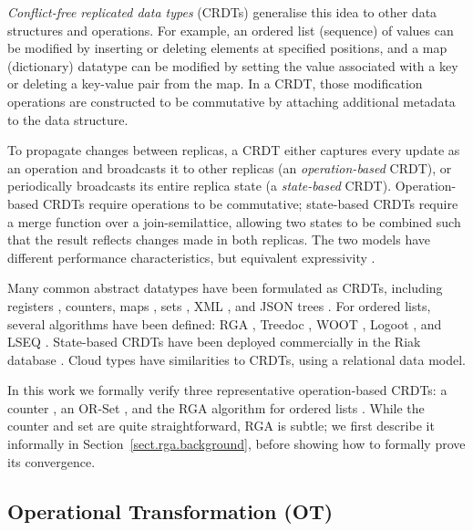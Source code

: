\emph{Conflict-free replicated data types} (CRDTs) generalise this idea to other data structures and
operations. For example, an ordered list (sequence) of values can be modified by inserting or
deleting elements at specified positions, and a map (dictionary) datatype can be modified by setting
the value associated with a key or deleting a key-value pair from the map. In a CRDT, those
modification operations are constructed to be commutative by attaching additional metadata to the
data structure.

To propagate changes between replicas, a CRDT either captures every update as an operation and
broadcasts it to other replicas (an \emph{operation-based} CRDT), or periodically broadcasts its
entire replica state (a \emph{state-based} CRDT). Operation-based CRDTs require operations to be
commutative; state-based CRDTs require a merge function over a join-semilattice, allowing two states
to be combined such that the result reflects changes made in both replicas. The two models have
different performance characteristics, but equivalent expressivity
\cite{Shapiro:2011wy,Shapiro:2011un}.

Many common abstract datatypes have been formulated as CRDTs, including
registers \cite{Shapiro:2011wy,Shapiro:2011un}, counters, maps \cite{Baquero:2016iv},
sets \cite{Bieniusa:2012wu,Bieniusa:2012gt}, XML \cite{Martin:2010ih},
and JSON trees \cite{Kleppmann:2016ve}. For ordered lists, several algorithms have been defined:
RGA \cite{Roh:2011dw}, Treedoc \cite{Preguica:2009fz}, WOOT \cite{Oster:2006wj},
Logoot \cite{Weiss:2010hx}, and LSEQ \cite{Nedelec:2013ky,Nedelec:2016eo}.
State-based CRDTs have been deployed commercially in the Riak database \cite{Brown:2014hs}.
Cloud types \cite{Burckhardt:2012jy} have similarities to CRDTs, using a relational data model.

In this work we formally verify three representative operation-based CRDTs: a counter
\cite{Shapiro:2011wy}, an OR-Set \cite{Bieniusa:2012gt}, and the RGA algorithm for ordered lists
\cite{Roh:2011dw}. While the counter and set are quite straightforward, RGA is subtle; we first
describe it informally in Section~\ref{sect.rga.background}, before showing how to formally prove
its convergence.


\subsection{Operational Transformation (OT)}\label{sect.related.ot}

